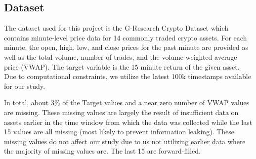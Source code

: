 \subsection{Dataset} \label{Dataset}

The dataset used for this project is the G-Research Crypto Dataset which contains minute-level price data for 14 commonly traded crypto assets. For each minute, the open, high, low, and close prices for the past minute are provided as well as the total volume, number of trades, and the volume weighted average price (VWAP). The target variable is the 15 minute return of the given asset. Due to computational constraints, we utilize the latest 100k timestamps available for our study.

In total, about 3\% of the Target values and a near zero number of VWAP values are missing. These missing values are largely the result of insufficient data on assets earlier in the time window from which the data was collected while the last 15 values are all missing (most likely to prevent information leaking). These missing values do not affect our study due to us not utilizing earlier data where the majority of missing values are. The last 15 are forward-filled.


